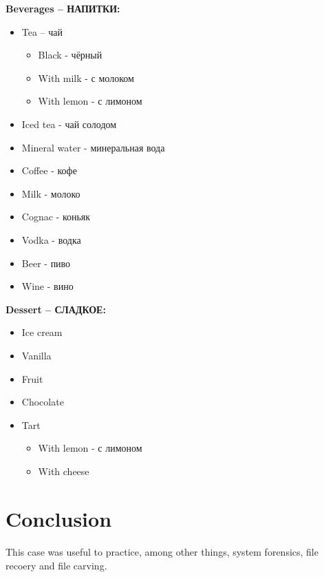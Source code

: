 \documentclass[
	12pt, %
]{fphw}
\begin{document}
\textbf{Beverages – \foreignlanguage{russian}{НАПИТКИ}:}

\begin{itemize}
	\item Tea – \foreignlanguage{russian}{чай}
	\begin{itemize}
		\item Black - \foreignlanguage{russian}{чёрный}
		\item With milk - \foreignlanguage{russian}{с молоком}
		\item With lemon - \foreignlanguage{russian}{с лимоном}
	\end{itemize}
	\item Iced tea - \foreignlanguage{russian}{чай солодом}
	\item Mineral water - \foreignlanguage{russian}{минеральная вода}
	\item Coffee - \foreignlanguage{russian}{кофе}
	\item Milk - \foreignlanguage{russian}{молоко}
	\item Cognac - \foreignlanguage{russian}{коньяк}
	\item Vodka - \foreignlanguage{russian}{водка}
	\item Beer - \foreignlanguage{russian}{пиво}
	\item Wine - \foreignlanguage{russian}{вино}
\end{itemize}

\textbf{Dessert – \foreignlanguage{russian}{СЛАДКОЕ}:}

\begin{itemize}
	\item Ice cream
	\item Vanilla
	\item Fruit
	\item Chocolate
	\item Tart
	\begin{itemize}
		\item With lemon - \foreignlanguage{russian}{с лимоном}
		\item With cheese
	\end{itemize}
\end{itemize}

\section*{Conclusion}
\label{sec:conclusion}

\paragraph{}
This case was useful to practice, among other things, system forensics, file recoery and file carving.\\





\end{document}
